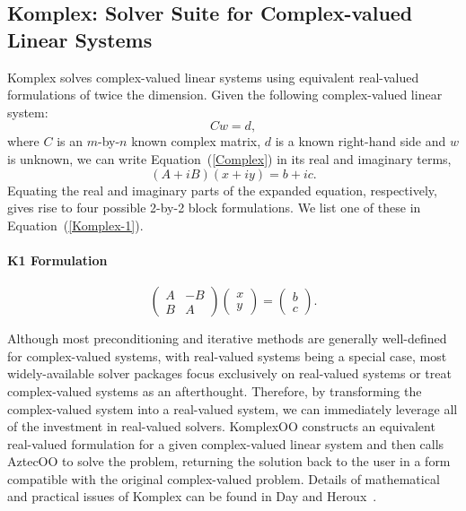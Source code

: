 \documentclass[12pt,relax]{SANDreport}
\begin{document}
\subsection{Komplex: Solver Suite for Complex-valued Linear Systems}

Komplex solves complex-valued linear systems using equivalent real-valued formulations of 
twice the dimension.  Given the following complex-valued linear system:
\begin{equation}
\label{Complex}
C w = d,
\end{equation}
where $C$ is an $m$-by-$n$ known
complex matrix, $d$ is a known right-hand side and $w$ is unknown, 
we can write Equation~(\ref{Complex})
in its real and imaginary terms,
\begin{equation}\label{linearsystem}
( A + i B )(x+iy) = b+ic.
\end{equation}
Equating the real and imaginary parts of the expanded equation, respectively,
gives rise to four
possible 2-by-2 block formulations.  We list one of these in Equation~(\ref{Komplex-1}).
\paragraph{K1 Formulation}
\begin{equation}\label{Komplex-1}
   \left( \begin{array}{rr}
                                    A & -B  \\
                                    B &  A
                             \end{array}
   \right)
   \left( \begin{array}{r}
                                    x  \\
                                    y
                             \end{array}
   \right)
   =
   \left( \begin{array}{r}
                                    b  \\
                                    c
                             \end{array}
   \right).
\end{equation}

Although most preconditioning and iterative methods are generally well-defined for
complex-valued systems, with real-valued systems being a special case, most widely-available
solver packages focus exclusively on real-valued systems or treat complex-valued systems as
an afterthought.  Therefore, by transforming the complex-valued system into a real-valued 
system, we can immediately leverage all of the investment in real-valued solvers.  KomplexOO
constructs an equivalent real-valued formulation for a given complex-valued linear system
and then calls AztecOO to solve the problem, returning the solution back to the user in
a form compatible with the original complex-valued problem.  Details of mathematical and
practical issues of Komplex can be found in Day and Heroux~\cite{DayHero2001}.
\end{document}
